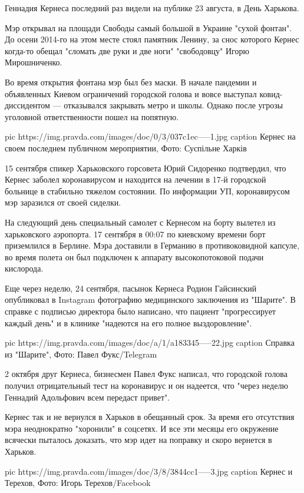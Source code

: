 Геннадия Кернеса последний раз видели на публике 23 августа, в День Харькова. 

Мэр открывал на площади Свободы самый большой в Украине "сухой фонтан". До
осени 2014-го на этом месте стоял памятник Ленину, за снос которого Кернес
когда-то обещал "сломать две руки и две ноги" "свободовцу" Игорю Мирошниченко.

Во время открытия фонтана мэр был без маски. В начале пандемии и объявленных
Киевом ограничений городской голова и вовсе выступал ковид-диссидентом —
отказывался закрывать метро и школы. Однако после угрозы уголовной
ответственности пошел на попятную. 

\ifcmt
pic https://img.pravda.com/images/doc/0/3/037c1ec-----1.jpg
caption Кернес на своем последнем публичном мероприятии, Фото: Суспільне Харків
\fi

15 сентября спикер Харьковского горсовета Юрий Сидоренко подтвердил, что Кернес
заболел коронавирусом и находится на лечении в 17-й городской больнице в
стабильно тяжелом состоянии. По информации УП, коронавирусом мэр заразился от
своей сиделки.

На следующий день специальный самолет с Кернесом на борту вылетел из
харьковского аэропорта. 17 сентября в 00:07 по киевскому времени борт
приземлился в Берлине. Мэра доставили в Германию в противоковидной капсуле, во
время полета он был подключен к аппарату высокопотоковой подачи кислорода. 

Еще через неделю, 24 сентября, пасынок Кернеса Родион Гайсинский опубликовал в
Instagram фотографию медицинского заключения из "Шарите". В справке с подписью
директора было написано, что пациент "прогрессирует каждый день" и в клинике
"надеются на его полное выздоровление". 

\ifcmt
pic https://img.pravda.com/images/doc/a/1/a183345-----22.jpg
caption Справка из "Шарите", Фото: Павел Фукс/Telegram
\fi

2 октября друг Кернеса, бизнесмен Павел Фукс написал, что городской голова
получил отрицательный тест на коронавирус и он надеется, что "через неделю
Геннадий Адольфович всем передаст привет". 

Кернес так и не вернулся в Харьков в обещанный срок. За время его отсутствия
мэра неоднократно "хоронили" в соцсетях. И все эти месяцы его окружение
всячески пыталось доказать, что мэр идет на поправку и скоро вернется в
Харьков.

\ifcmt
pic https://img.pravda.com/images/doc/3/8/3844cc1-----3.jpg
caption Кернес и Терехов, Фото: Игорь Терехов/Facebook
\fi

